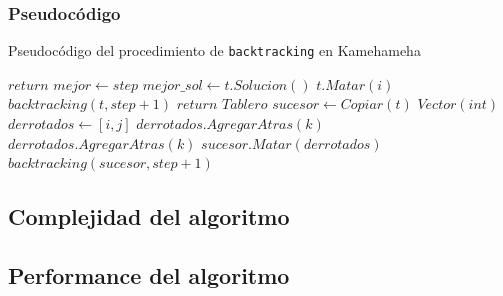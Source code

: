 \subsubsection{Pseudocódigo}
  \begin{algorithm}[H]
  \begin{algorithmic}
  \caption{Pseudocódigo del procedimiento de \texttt{backtracking} en Kamehameha}
      \State $return$
    \EndIf
      \State $mejor \gets step$
      \State $mejor\_sol \gets t.Solucion()$
    \Else
      \For {$i \in [0,..., n),$ $t.EstaVivo?(i)$}
          \State $t.Matar(i)$
          \State $backtracking(t, step+1)$
          \State $return$
        \EndIf
        \For {$j \in [0,..., n),$ $j \neq i \land t.EstaVivo?(j)$}
          \State $Tablero$ $sucesor \gets Copiar(t)$
          \State $Vector(int)$ $derrotados \gets [i, j]$ 
          \For {$k \in [0,..., n),$ $k \neq i \land k \neq j \land t.EstaVivo?(k)$}
                \State $derrotados.AgregarAtras(k)$
              \EndIf
            \Else 
                \State $derrotados.AgregarAtras(k)$
              \EndIf
            \EndIf
          \EndFor
          \State $sucesor.Matar(derrotados)$
          \State $backtracking(sucesor, step+1)$
        \EndFor
      \EndFor
    \EndIf
    \EndProcedure
  \end{algorithmic}
  \end{algorithm}

\subsection{Complejidad del algoritmo}

\subsection{Performance del algoritmo}

